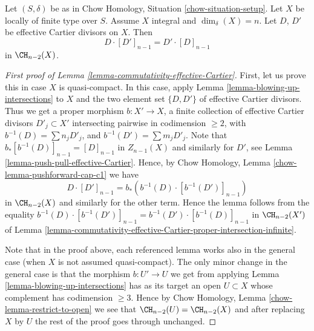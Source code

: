 \begin{lemma}
\label{lemma-commutativity-effective-Cartier}
Let $(S, \delta)$ be as in Chow Homology, Situation \ref{chow-situation-setup}.
Let $X$ be locally of finite type over $S$.
Assume $X$ integral and $\dim_\delta(X) = n$.
Let $D$, $D'$ be effective Cartier divisors on $X$.
Then
$$
D \cdot [D']_{n - 1} = D' \cdot [D]_{n - 1}
$$
in $\CH_{n - 2}(X)$.
\end{lemma}

\begin{proof}[First proof of Lemma \ref{lemma-commutativity-effective-Cartier}]
First, let us prove this in case $X$ is quasi-compact.
In this case, apply
Lemma \ref{lemma-blowing-up-intersections} to $X$ and the
two element set $\{D, D'\}$ of effective Cartier divisors.
Thus we get a proper morphism $b : X' \to X$,
a finite collection of effective Cartier
divisors $D'_j \subset X'$ intersecting pairwise in codimension $\geq 2$,
with $b^{-1}(D) = \sum n_j D'_j$, and $b^{-1}(D') = \sum m_j D'_j$.
Note that $b_*[b^{-1}(D)]_{n - 1} = [D]_{n - 1}$ in $Z_{n - 1}(X)$
and similarly for $D'$,
see Lemma \ref{lemma-push-pull-effective-Cartier}.
Hence, by Chow Homology, Lemma \ref{chow-lemma-pushforward-cap-c1} we have
$$
D \cdot [D']_{n - 1} = b_*\left(b^{-1}(D) \cdot [b^{-1}(D')]_{n - 1}\right)
$$
in $\CH_{n - 2}(X)$ and similarly for the other term. Hence the
lemma follows from the equality
$b^{-1}(D) \cdot [b^{-1}(D')]_{n - 1} = b^{-1}(D') \cdot [b^{-1}(D)]_{n - 1}$
in $\CH_{n - 2}(X')$ of Lemma
\ref{lemma-commutativity-effective-Cartier-proper-intersection-infinite}.

\medskip\noindent
Note that in the proof above, each referenced lemma works also
in the general case (when $X$ is not assumed quasi-compact). The
only minor change in the general case is that the morphism
$b : U' \to U$ we get from applying
Lemma \ref{lemma-blowing-up-intersections}
has as its target
an open $U \subset X$ whose complement has codimension $\geq 3$.
Hence by Chow Homology, Lemma \ref{chow-lemma-restrict-to-open} we see that
$\CH_{n - 2}(U) = \CH_{n - 2}(X)$
and after replacing $X$ by $U$ the rest of the proof goes through
unchanged.
\end{proof}

